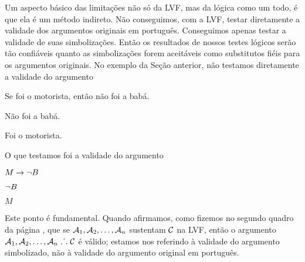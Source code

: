 Um aspecto básico das limitações não só da LVF, mas da lógica como um todo, é que ela é um método indireto.
Não conseguimos, com a LVF, testar diretamente a validade dos argumentos originais em português.
Conseguimos apenas testar a validade de suas simbolizações.
Então os resultados de nossos testes lógicos serão tão confiáveis quanto as simbolizações forem aceitáveis como substitutos fiéis para os argumentos originais.
No exemplo da Seção anterior, não testamos diretamente a validade do argumento
	\begin{earg}
		\item[] Se foi o motorista, então não foi a babá.
		\item[] Não foi a babá.
		\item[\therefore] Foi o motorista.
	\end{earg}
O que testamos foi a validade do argumento
	\begin{earg}
		\item[] $M \rightarrow \neg B$
		\item[] $\neg B$
		\item[\therefore] $M$
	\end{earg}

Este ponto é fundamental.
Quando afirmamos, como fizemos no segundo quadro da página \pageref{SusVal}, que se $\mathcal{A}_1, \mathcal{A}_2, \ldots, \mathcal{A}_n$ sustentam $\mathcal{C}$ na LVF, então o argumento  $\mathcal{A}_1, \mathcal{A}_2, \ldots, \mathcal{A}_n \mathrel{\ldotp\dot{}\,\ldotp} \mathcal{C}$ é  válido; estamos nos referindo à validade do argumento simbolizado, não à validade do argumento original em português.

